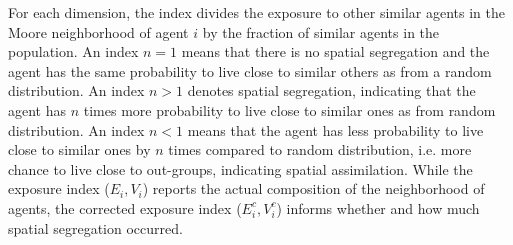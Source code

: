 \documentclass{article}
\begin{document}
For each dimension, the index divides the exposure to other similar agents in the Moore neighborhood of agent $\textit{i}$ by the fraction of similar agents in the population. An index $n = 1$ means that there is no spatial segregation and the agent has the same probability to live close to similar others as from a random distribution. An index $n > 1$ denotes spatial segregation, indicating that the agent has $n$ times more probability to live close to similar ones as from random distribution. An index $n < 1$ means that the agent has less probability to live close to similar ones by $n$ times compared to random distribution, i.e. more chance to live close to out-groups, indicating spatial assimilation. While the exposure index ($E_i,V_i$) reports the actual composition of the neighborhood of agents, the corrected exposure index ($E^c_i,V^c_i$) informs whether and how much spatial segregation occurred.


\end{document}
